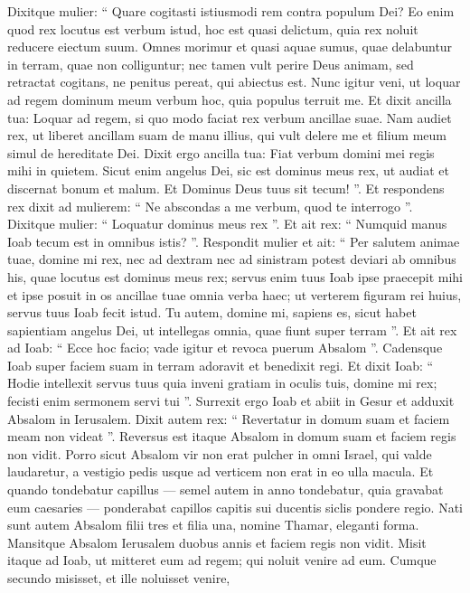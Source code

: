\begin{biblechapter}
\begin{biblechapter}
\begin{biblechapter}
\begin{biblechapter}
\begin{biblechapter}
\begin{biblechapter}
\begin{biblechapter}
\begin{biblechapter}
\begin{biblechapter}
\begin{biblechapter}
\begin{biblechapter}
\begin{biblechapter}
\begin{biblechapter}
\begin{biblechapter}
\verse Dixitque mulier: “ Quare cogitasti istiusmodi rem contra populum Dei? Eo enim quod rex locutus est verbum istud, hoc est quasi delictum, quia rex noluit reducere eiectum suum. 
\verse Omnes morimur et quasi aquae sumus, quae delabuntur in terram, quae non colliguntur; nec tamen vult perire Deus animam, sed retractat cogitans, ne penitus pereat, qui abiectus est. 
 \verse Nunc igitur veni, ut loquar ad regem dominum meum verbum hoc, quia populus terruit me. Et dixit ancilla tua: Loquar ad regem, si quo modo faciat rex verbum ancillae suae. 
\verse Nam audiet rex, ut liberet ancillam suam de manu illius, qui vult delere me et filium meum simul de hereditate Dei. 
\verse Dixit ergo ancilla tua: Fiat verbum domini mei regis mihi in quietem. Sicut enim angelus Dei, sic est dominus meus rex, ut audiat et discernat bonum et malum. Et Dominus Deus tuus sit tecum! ”.
 \verse Et respondens rex dixit ad mulierem: “ Ne abscondas a me verbum, quod te interrogo ”. Dixitque mulier: “ Loquatur dominus meus rex ”. 
\verse Et ait rex: “ Numquid manus Ioab tecum est in omnibus istis? ”. Respondit mulier et ait: “ Per salutem animae tuae, domine mi rex, nec ad dextram nec ad sinistram potest deviari ab omnibus his, quae locutus est dominus meus rex; servus enim tuus Ioab ipse praecepit mihi et ipse posuit in os ancillae tuae omnia verba haec; 
\verse ut verterem figuram rei huius, servus tuus Ioab fecit istud. Tu autem, domine mi, sapiens es, sicut habet sapientiam angelus Dei, ut intellegas omnia, quae fiunt super terram ”.
 \verse Et ait rex ad Ioab: “ Ecce hoc facio; vade igitur et revoca puerum Absalom ”. 
 \verse Cadensque Ioab super faciem suam in terram adoravit et benedixit regi. Et dixit Ioab: “ Hodie intellexit servus tuus quia inveni gratiam in oculis tuis, domine mi rex; fecisti enim sermonem servi tui ”. 
\verse Surrexit ergo Ioab et abiit in Gesur et adduxit Absalom in Ierusalem. 
\verse Dixit autem rex: “ Revertatur in domum suam et faciem meam non videat ”. Reversus est itaque Absalom in domum suam et faciem regis non vidit.
 \verse Porro sicut Absalom vir non erat pulcher in omni Israel, qui valde laudaretur, a vestigio pedis usque ad verticem non erat in eo ulla macula. 
 \verse Et quando tondebatur capillus — semel autem in anno tondebatur, quia gravabat eum caesaries — ponderabat capillos capitis sui ducentis siclis pondere regio. 
 \verse Nati sunt autem Absalom filii tres et filia una, nomine Thamar, eleganti forma.
 \verse Mansitque Absalom Ierusalem duobus annis et faciem regis non vidit. 
\verse Misit itaque ad Ioab, ut mitteret eum ad regem; qui noluit venire ad eum. Cumque secundo misisset, et ille noluisset venire, 

\end{biblechapter}
\end{biblechapter}
\end{biblechapter}
\end{biblechapter}
\end{biblechapter}
\end{biblechapter}
\end{biblechapter}
\end{biblechapter}
\end{biblechapter}
\end{biblechapter}
\end{biblechapter}
\end{biblechapter}
\end{biblechapter}
\end{biblechapter}
